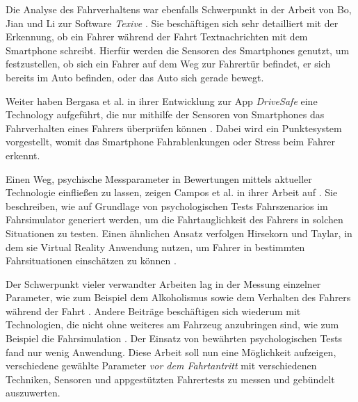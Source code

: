 Die Analyse des Fahrverhaltens war ebenfalls Schwerpunkt in der Arbeit von Bo, Jian und Li zur Software \textit{Texive} \cite{texive}. Sie beschäftigen sich sehr detailliert mit der Erkennung, ob ein Fahrer während der Fahrt Textnachrichten mit dem Smartphone schreibt. Hierfür werden die Sensoren des Smartphones genutzt, um festzustellen, ob sich ein Fahrer auf dem Weg zur Fahrertür befindet, er sich bereits im Auto befinden, oder das Auto sich gerade bewegt.

Weiter haben Bergasa et al. in ihrer Entwicklung zur App \textit{DriveSafe} eine Technology aufgeführt, die nur mithilfe der Sensoren von Smartphones das Fahrverhalten eines Fahrers überprüfen können \cite{drivesafe}. Dabei wird ein Punktesystem vorgestellt, womit das Smartphone Fahrablenkungen oder Stress beim Fahrer erkennt.

Einen Weg, psychische Messparameter in Bewertungen mittels aktueller Technologie einfließen zu lassen, zeigen Campos et al. in ihrer Arbeit auf \cite{drivingsimulations}. Sie beschreiben, wie auf Grundlage von psychologischen Tests Fahrszenarios im Fahrsimulator generiert werden, um die Fahrtauglichkeit des Fahrers in solchen Situationen zu testen. Einen ähnlichen Ansatz verfolgen Hirsekorn und Taylar, in dem sie Virtual Reality Anwendung nutzen, um Fahrer in bestimmten Fahrsituationen einschätzen zu können \cite{vrapplications}.

Der Schwerpunkt vieler verwandter Arbeiten lag in der Messung einzelner Parameter, wie zum Beispiel dem Alkoholismus \cite{mobilesmarttracking,sobrietymobiletests} sowie dem Verhalten des Fahrers während der Fahrt \cite{smartphoneresearchplatform, texive, drivesafe}. Andere Beiträge beschäftigen sich wiederum mit Technologien, die nicht ohne weiteres am Fahrzeug anzubringen sind, wie zum Beispiel die Fahrsimulation \cite{drivingsimulations, interaktivefahrsimulation, vrapplications}. Der Einsatz von bewährten psychologischen Tests fand nur wenig Anwendung. Diese Arbeit soll nun eine Möglichkeit aufzeigen, verschiedene gewählte Parameter \textit{vor dem Fahrtantritt} mit verschiedenen Techniken, Sensoren und appgestützten Fahrertests zu messen und gebündelt auszuwerten.
